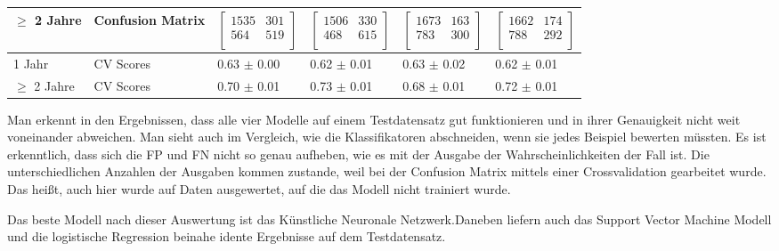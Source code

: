 \begin{table}[ht]
\begin{tabular}{ p{2cm} p{2cm} p{2cm} p{2cm} p{2cm} p{2cm} }
    $\geq$ 2 Jahre & Confusion Matrix & $\left[ \begin{array}{rr} 1535 & 301 \\  564 & 519 \\  \end{array}\right]$ & $\left[ \begin{array}{rr} 1506 & 330  \\  468 & 615 \\  \end{array}\right]$ & $\left[ \begin{array}{rr} 1673 & 163  \\  783 & 300 \\  \end{array}\right]$ & $\left[ \begin{array}{rr} 1662 & 174  \\  788 & 292 \\  \end{array}\right]$ \\

    \midrule
    1 Jahr         & CV Scores        & 0.63 $\pm$ 0.00                            & 0.62 $\pm$ 0.01                            & 0.63 $\pm$ 0.02                            & 0.62 $\pm$ 0.01                            \\
    $\geq$ 2 Jahre & CV Scores        & 0.70 $\pm$ 0.01                            & 0.73 $\pm$ 0.01                            & 0.68 $\pm$ 0.01                            & 0.72 $\pm$ 0.01                            \\

    \bottomrule
  \end{tabular}
\end{table}

Man erkennt in den Ergebnissen, dass alle vier Modelle auf einem Testdatensatz gut funktionieren und in ihrer Genauigkeit nicht weit voneinander
abweichen. Man sieht auch im Vergleich, wie die Klassifikatoren abschneiden, wenn sie jedes Beispiel bewerten m\"ussten. Es ist erkenntlich, dass sich die FP und FN nicht
so genau aufheben, wie es mit der Ausgabe der Wahrscheinlichkeiten der Fall ist. Die unterschiedlichen Anzahlen der Ausgaben kommen zustande, weil bei der Confusion Matrix
mittels einer Crossvalidation gearbeitet wurde. Das hei{\ss}t, auch hier wurde auf Daten ausgewertet, auf die das Modell nicht trainiert wurde.

Das beste Modell nach dieser Auswertung ist das K\"unstliche Neuronale Netzwerk.Daneben liefern auch das Support Vector Machine Modell und die logistische Regression beinahe
idente Ergebnisse auf dem Testdatensatz.







